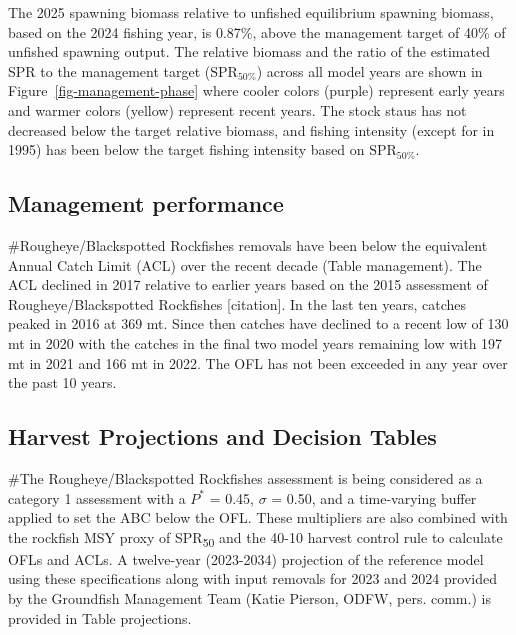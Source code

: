 \documentclass[
]{scrartcl}
\begin{document}
The 2025 spawning biomass relative to unfished equilibrium spawning
biomass, based on the 2024 fishing year, is 0.87\%, above the management
target of 40\% of unfished spawning output. The relative biomass and the
ratio of the estimated SPR to the management target
(\(\text{SPR}_{50\%}\)) across all model years are shown in
Figure~\ref{fig-management-phase} where cooler colors (purple) represent
early years and warmer colors (yellow) represent recent years. The stock
staus has not decreased below the target relative biomass, and fishing
intensity (except for in 1995) has been below the target fishing
intensity based on \(\text{SPR}_{50\%}\).

\subsection{Management performance}\label{management-performance-1}

\#Rougheye/Blackspotted Rockfishes removals have been below the
equivalent Annual Catch Limit (ACL) over the recent decade (Table
management). The ACL declined in 2017 relative to earlier years based on
the 2015 assessment of Rougheye/Blackspotted Rockfishes {[}citation{]}.
In the last ten years, catches peaked in 2016 at 369 mt. Since then
catches have declined to a recent low of 130 mt in 2020 with the catches
in the final two model years remaining low with 197 mt in 2021 and 166
mt in 2022. The OFL has not been exceeded in any year over the past 10
years.

\subsection{Harvest Projections and Decision
Tables}\label{harvest-projections-and-decision-tables-1}

\#The Rougheye/Blackspotted Rockfishes assessment is being considered as
a category 1 assessment with a \(P^*\) = 0.45, \(\sigma\) = 0.50, and a
time-varying buffer applied to set the ABC below the OFL. These
multipliers are also combined with the rockfish MSY proxy of
SPR\textsubscript{50} and the 40-10 harvest control rule to calculate
OFLs and ACLs. A twelve-year (2023-2034) projection of the reference
model using these specifications along with input removals for 2023 and
2024 provided by the Groundfish Management Team (Katie Pierson, ODFW,
pers. comm.) is provided in Table projections.
\end{document}
